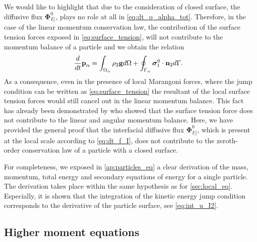 We would like to highlight that  due to the consideration of closed surface, the diffusive flux $\mathbf{\Phi}_{I||}^0$, plays no role at all in \ref{eq:dt_q_alpha_tot}.
Therefore, in the case of the linear momentum conservation law, the contribution of the surface tension forces exposed in \ref{eq:surface_tension}, will not contribute to the momentum balance of a particle and we obtain the relation 
\begin{equation}
    \frac{d}{dt}  \textbf{p}_\alpha
    = \int_{\Omega_\alpha}  \rho_2\textbf{g}  d\Omega
    + \oint_{\Gamma_\alpha}  
        \bm{\sigma}_1^0
        \cdot \textbf{n}_2  d\Gamma. 
\end{equation}
As a consequence, even in the presence of local Marangoni forces, where the jump condition can be written as \ref{eq:surface_tension}  the resultant of the local surface tension forces would still cancel out in the linear momentum balance.
This fact has already been demonstrated by \citet{hesla1993note} who showed that the surface tension force does not contribute to the linear and angular momentum balance. 
Here, we have provided the general proof that the interfacial diffusive flux $\mathbf{\Phi}_{I||}^0$, which is present at the local scale according to \ref{eq:dt_f_I}, does not contribute to the zeroth-order conservation law of a particle with a closed surface.

For completeness, we exposed in \ref{ap:particles_eq} a clear derivation of the mass, momentum, total energy and secondary equations of energy for a single particle.
The derivation takes place within the same hypothesis as for \ref{sec:local_eq}. 
Especially, it is shown that the integration of the kinetic energy jump condition corresponds to the derivative of the particle surface, see \ref{eq:int_u_I2}. 

\subsection{Higher moment equations}

